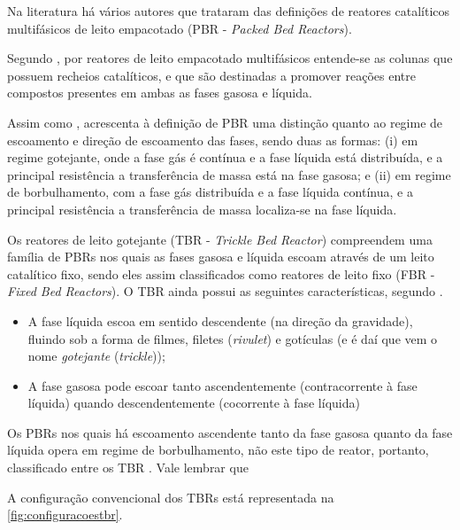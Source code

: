 Na literatura há vários autores que trataram das definições de
reatores catalíticos multifásicos de leito empacotado (PBR - \emph{Packed Bed
Reactors}).

Segundo , por reatores de leito empacotado multifásicos
entende-se as colunas que possuem recheios catalíticos, e que são destinadas a
promover reações entre compostos presentes em ambas as fases gasosa e líquida.

Assim como ,  acrescenta à
definição de PBR uma distinção quanto ao regime de escoamento e direção de
escoamento das fases, sendo duas as formas: (i) em regime gotejante, onde a fase
gás é contínua e a fase líquida está distribuída, e a principal resistência a
transferência de massa está na fase gasosa; e (ii) em regime de borbulhamento,
com a fase gás distribuída e a fase líquida contínua, e a principal resistência
a transferência de massa localiza-se na fase líquida.

Os reatores de leito gotejante (TBR - \emph{Trickle Bed Reactor}) compreendem
uma família de PBRs nos quais as fases gasosa e líquida escoam através de um
leito catalítico fixo, sendo eles assim classificados como reatores de leito
fixo (FBR - \emph{Fixed Bed Reactors}). O TBR ainda possui as seguintes
características, segundo .

\begin{itemize}
\item A fase líquida escoa em sentido descendente (na direção da gravidade),
fluindo sob a forma de filmes, filetes (\emph{rivulet}) e gotículas (e é daí
que vem o nome \textit{gotejante} (\emph{trickle}));
\item A fase gasosa pode escoar tanto ascendentemente (contracorrente à
fase líquida) quando descendentemente (cocorrente à fase líquida)
\end{itemize}

Os PBRs nos quais há escoamento ascendente tanto da fase gasosa quanto da
fase líquida opera em regime de borbulhamento, não este tipo de reator,
portanto, classificado entre os TBR \cite{Ancheyta2011}. Vale lembrar que

A configuração convencional dos TBRs está representada na
\autoref{fig:configuracoestbr}.

